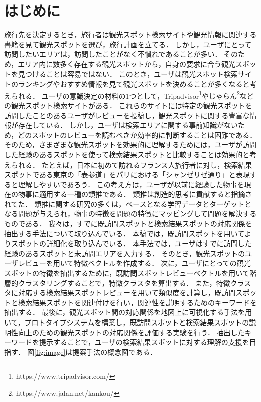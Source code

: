 \documentclass{deimj}
\begin{document}
\section{はじめに}
\label{sec:はじめに}
旅行先を決定するとき，旅行者は観光スポット検索サイトや観光情報に関連する書籍を見て観光スポットを選び，旅行計画を立てる．
しかし，ユーザにとって訪問したいエリアは，訪問したことがなく不慣れであることが多い．
そのため，エリア内に数多く存在する観光スポットから，自身の要求に合う観光スポットを見つけることは容易ではない．
このとき，ユーザは観光スポット検索サイトのランキングやおすすめ情報を見て観光スポットを決めることが多くなると考えられる．
ユーザの意識決定の材料の1つとして，Tripadvisor\footnote{https://www.tripadvisor.com/}やじゃらん\footnote{https://www.jalan.net/kankou/}などの観光スポット検索サイトがある．
これらのサイトには特定の観光スポットを訪問したことのあるユーザがレビューを投稿し，観光スポットに関する豊富な情報が存在している．
しかし，ユーザは検索エリアに関する事前知識がないため，どのスポットのレビューを読むべきか効率的に判断することは困難である．
そのため，さまざまな観光スポットを効果的に理解するためには，ユーザが訪問した経験のあるスポットを使って検索結果スポットと比較することは効果的と考えられる．
たとえば，日本に初めて訪れるフランス人旅行者に対し，検索結果スポットである東京の「表参道」をパリにおける「シャンゼリゼ通り」と表現すると理解しやすいであろう．
この考え方は，ユーザが以前に経験した物事を現在の物事に適用する一種の類推である\cite{Gentner}．
類推は創造的思考に貢献すると指摘されてた\cite{Holyoak}．
類推に関する研究の多くは，ベースとなる学習データとターゲットとなる問題が与えられ，物事の特徴を問題の特徴にマッピングして問題を解決するもの\cite{Gick}である．
我々は，すでに既訪問スポットと検索結果スポットの対応関係を抽出する手法について取り込んでいる\cite{潘DEIM}．
本稿では，既訪問スポットを用いてよりスポットの詳細化を取り込んでいる．
本手法では，ユーザはすでに訪問した経験のあるスポットと未訪問エリアを入力する．
そのとき，観光スポットのユーザレビューを用いて特徴ベクトルを作成する．
次に，ユーザにとっての観光スポットの特徴を抽出するために，既訪問スポットレビューベクトルを用いて階層的クラスタリングすることで，特徴クラスタを算出する．
また，特徴クラスタに対応する検索結果スポットレビューを用いて類似度を計算し，既訪問スポットと検索結果スポットを関連付けを行い，関連性を説明するためのキーワードを抽出する．
最後に，観光スポット間の対応関係を地図上に可視化する手法\cite{潘STI}を用いて，プロトタイプシステムを構築し，既訪問スポットと検索結果スポットの説明性向上のための観光スポットの対応関係を評価する実験を行う．
抽出したキーワードを提示することで，ユーザの検索結果スポットに対する理解の支援を目指す．
図\ref{fig:image}は提案手法の概念図である．
\end{document}
